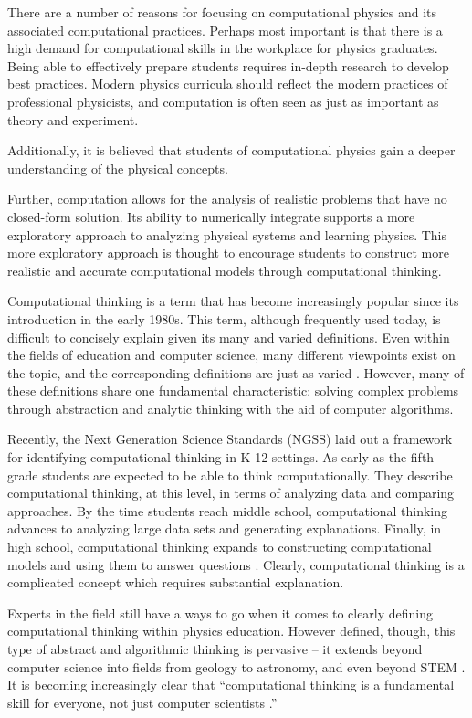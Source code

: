 \documentclass{msuphddissertation}
\begin{document}
\begin{doublespace}
There are a number of reasons for focusing on computational physics and its associated computational practices.  Perhaps most important is that there is a high demand for computational skills in the workplace for physics graduates.  Being able to effectively prepare students requires in-depth research to develop best practices.  Modern physics curricula should reflect the modern practices of professional physicists, and computation is often seen as just as important as theory and experiment.

Additionally, it is believed that students of computational physics gain a deeper understanding of the physical concepts.

Further, computation allows for the analysis of realistic problems that have no closed-form solution.  Its ability to numerically integrate supports a more exploratory approach to analyzing physical systems and learning physics.  This more exploratory approach is thought to encourage students to construct more realistic and accurate computational models through computational thinking.


Computational thinking is a term that has become increasingly popular since its introduction in the early 1980s.  This term, although frequently used today, is difficult to concisely explain given its many and varied definitions.  Even within the fields of education and computer science, many different viewpoints exist on the topic, and the corresponding definitions are just as varied \cite{Grover2013}.  However, many of these definitions share one fundamental characteristic: solving complex problems through abstraction and analytic thinking with the aid of computer algorithms.

Recently, the Next Generation Science Standards (NGSS) laid out a framework for identifying computational thinking in K-12 settings.  As early as the fifth grade students are expected to be able to think computationally.  They describe computational thinking, at this level, in terms of analyzing data and comparing approaches.  By the time students reach middle school, computational thinking advances to analyzing large data sets and generating explanations.  Finally, in high school, computational thinking expands to constructing computational models and using them to answer questions \cite{NGSS2012}.  Clearly, computational thinking is a complicated concept which requires substantial explanation.

Experts in the field still have a ways to go when it comes to clearly defining computational thinking within physics education.  However defined, though, this type of abstract and algorithmic thinking is pervasive -- it extends beyond computer science into fields from geology to astronomy, and even beyond STEM \cite{Bundy2007}.  It is becoming increasingly clear that ``computational thinking is a fundamental skill for everyone, not just computer scientists \cite{Wing2006}.''


\end{doublespace}
\end{document}
